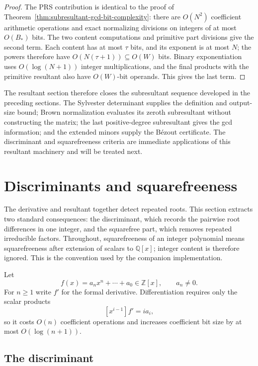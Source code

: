 \documentclass[11pt]{book}
\theoremstyle{definition}
\newcommand{\ZZ}{\mathbb Z}
\begin{document}
\begin{proof}
The PRS contribution is identical to the proof of
Theorem~\ref{thm:subresultant-gcd-bit-complexity}: there are $O(N^2)$
coefficient arithmetic operations and exact normalizing divisions on
integers of at most $O(B_*)$ bits.  The two content computations and primitive
part divisions give the second term.  Each content has at most $\tau$ bits,
and its exponent is at most $N$; the powers therefore have
$O(N(\tau+1))\subseteq O(W)$ bits.  Binary exponentiation uses
$O(\log(N+1))$ integer multiplications, and the final products with the
primitive resultant also have $O(W)$-bit operands.  This gives the last term.
\end{proof}

The resultant section therefore closes the subresultant sequence developed in
the preceding sections.  The Sylvester determinant supplies the definition
and output-size bound; Brown normalization evaluates its zeroth subresultant
without constructing the matrix; the last positive-degree subresultant gives
the gcd information; and the extended minors supply the B\'ezout certificate.
The discriminant and squarefreeness criteria are immediate applications of
this resultant machinery and will be treated next.


\section{Discriminants and squarefreeness}\label{sec:discriminant-squarefree}

The derivative and resultant together detect repeated roots.  This section
extracts two standard consequences: the discriminant, which records the
pairwise root differences in one integer, and the squarefree part, which
removes repeated irreducible factors.  Throughout, squarefreeness of an
integer polynomial means squarefreeness after extension of scalars to
$\mathbb Q[x]$; integer content is therefore ignored.  This is the convention
used by the companion implementation.

Let
\[
 f(x)=a_nx^n+\cdots+a_0\in\ZZ[x],\qquad a_n\ne0.
\]
For $n\ge1$ write $f'$ for the formal derivative.  Differentiation requires
only the scalar products
\[
 [x^{i-1}]f'=i a_i,
\]
so it costs $O(n)$ coefficient operations and increases coefficient bit size
by at most $O(\log(n+1))$.

\subsection{The discriminant}
\end{document}
